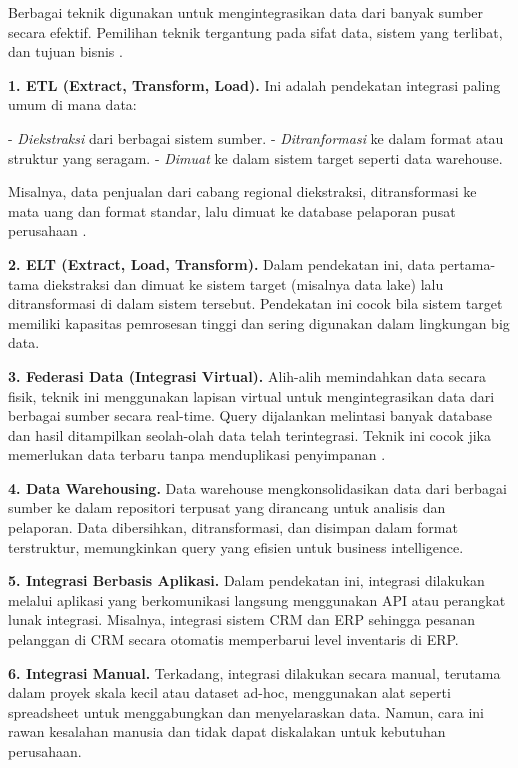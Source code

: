 Berbagai teknik digunakan untuk mengintegrasikan data dari banyak sumber secara efektif. Pemilihan teknik tergantung pada sifat data, sistem yang terlibat, dan tujuan bisnis \cite{singh2005survey}.

\textbf{1. ETL (Extract, Transform, Load).}  
Ini adalah pendekatan integrasi paling umum di mana data:

- \emph{Diekstraksi} dari berbagai sistem sumber.
- \emph{Ditranformasi} ke dalam format atau struktur yang seragam.
- \emph{Dimuat} ke dalam sistem target seperti data warehouse.

Misalnya, data penjualan dari cabang regional diekstraksi, ditransformasi ke mata uang dan format standar, lalu dimuat ke database pelaporan pusat perusahaan \cite{vassiliadis2002etl}.

\textbf{2. ELT (Extract, Load, Transform).}  
Dalam pendekatan ini, data pertama-tama diekstraksi dan dimuat ke sistem target (misalnya data lake) lalu ditransformasi di dalam sistem tersebut. Pendekatan ini cocok bila sistem target memiliki kapasitas pemrosesan tinggi dan sering digunakan dalam lingkungan big data.

\textbf{3. Federasi Data (Integrasi Virtual).}  
Alih-alih memindahkan data secara fisik, teknik ini menggunakan lapisan virtual untuk mengintegrasikan data dari berbagai sumber secara real-time. Query dijalankan melintasi banyak database dan hasil ditampilkan seolah-olah data telah terintegrasi. Teknik ini cocok jika memerlukan data terbaru tanpa menduplikasi penyimpanan \cite{halevy2001answering}.

\textbf{4. Data Warehousing.}  
Data warehouse mengkonsolidasikan data dari berbagai sumber ke dalam repositori terpusat yang dirancang untuk analisis dan pelaporan. Data dibersihkan, ditransformasi, dan disimpan dalam format terstruktur, memungkinkan query yang efisien untuk business intelligence.

\textbf{5. Integrasi Berbasis Aplikasi.}  
Dalam pendekatan ini, integrasi dilakukan melalui aplikasi yang berkomunikasi langsung menggunakan API atau perangkat lunak integrasi. Misalnya, integrasi sistem CRM dan ERP sehingga pesanan pelanggan di CRM secara otomatis memperbarui level inventaris di ERP.

\textbf{6. Integrasi Manual.}  
Terkadang, integrasi dilakukan secara manual, terutama dalam proyek skala kecil atau dataset ad-hoc, menggunakan alat seperti spreadsheet untuk menggabungkan dan menyelaraskan data. Namun, cara ini rawan kesalahan manusia dan tidak dapat diskalakan untuk kebutuhan perusahaan.

